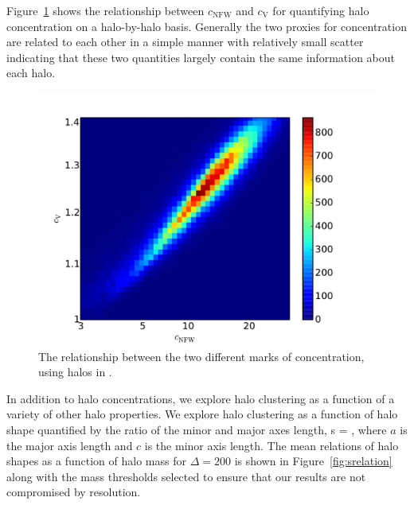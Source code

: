\documentclass[usenatbib,usegraphicx,letterpaper]{mn2e}
\begin{document}
Figure~\ref{fig:concentrations} shows the relationship between $c_{\mathrm{NFW}}$ and $c_{\mathrm{V}}$ for quantifying halo 
concentration on a halo-by-halo basis. Generally the two proxies for concentration are related to each other in a simple manner 
with relatively small scatter indicating that these two quantities largely contain the same information about each halo.

\begin{figure}
\centering
\includegraphics[width=.5\textwidth]{L0250_compare_cnfwvcV_z00.pdf}
\caption{The relationship between the two different marks of concentration, using halos in \simB.
}
\label{fig:concentrations}
\end{figure}

In addition to halo concentrations, we explore halo clustering as a function of a variety of other 
halo properties. We explore halo clustering as a function of halo shape quantified by the ratio of 
the minor and major axes length, 
\beq
s = ,
\eeq
where $a$ is the major axis length and $c$ is the minor axis length. The mean relations of halo shapes 
as a function of halo mass for $\Delta=200$ is shown in Figure~\ref{fig:srelation} along with the mass 
thresholds selected to ensure that our results are not compromised by resolution.
\end{document}
